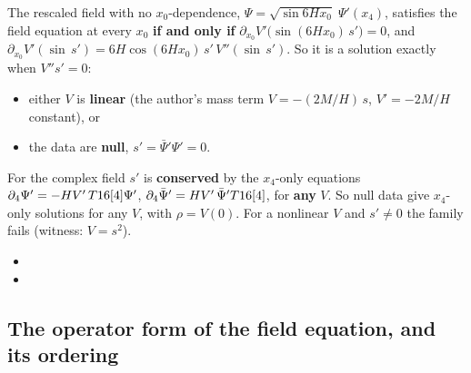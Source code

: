 The rescaled field with no $x_0$-dependence, $\Psi=\sqrt{\sin 6Hx_0}\;\Psi'(x_4)$, satisfies the field
equation at every $x_0$ \textbf{if and only if} $\partial_{x_0}V'\bigl(\sin(6Hx_0)\,s'\bigr)=0$, and
$\partial_{x_0}V'(\sin\,s')=6H\cos(6Hx_0)\,s'\,V''(\sin\,s')$. So it is a solution exactly when
$V''s'=0$:
\begin{itemize}
  \item either $V$ is \textbf{linear} (the author's mass term $V=-(2M/H)\,s$, $V'=-2M/H$ constant), or
  \item the data are \textbf{null}, $s'=\bar\Psi'\Psi'=0$.
\end{itemize}
For the complex field $s'$ is \textbf{conserved} by the $x_4$-only equations
$\partial_4\Psi'=-HV'\,T16[4]\Psi'$, $\partial_4\bar\Psi'=HV'\,\bar\Psi'T16[4]$, for \textbf{any}
$V$. So null data give $x_4$-only solutions for any $V$, with $\rho=V(0)$. For a nonlinear $V$ and
$s'\neq0$ the family fails (witness: $V=s^2$). 
\begin{itemize}
  \item {}
  \item {}
\end{itemize}

\subsection{The operator form of the field equation, and its ordering}
\label{sec:5.9}

